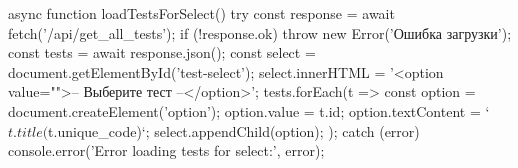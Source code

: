         async function loadTestsForSelect() {
            try {
                const response = await fetch('/api/get_all_tests');
                if (!response.ok) throw new Error('Ошибка загрузки');
                const tests = await response.json();
                const select = document.getElementById('test-select');
                select.innerHTML = '<option value="">-- Выберите тест --</option>';
                tests.forEach(t => {
                    const option = document.createElement('option');
                    option.value = t.id;
                    option.textContent = `${t.title} (${t.unique_code})`;
                    select.appendChild(option);
                });
            } catch (error) {
                console.error('Error loading tests for select:', error);
            }
        }

